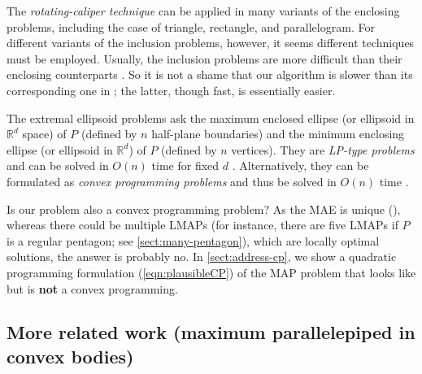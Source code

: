 \documentclass{ws-ijcga}
\begin{document}
The \emph{rotating-caliper technique} \cite{Classic-rcaliper-MEL83} can be applied in many variants of the enclosing problems, including the case of triangle, rectangle, and parallelogram.
    For different variants of the inclusion problems, however, it seems different techniques must be employed.
Usually, the inclusion problems are more difficult than their enclosing counterparts \cite{Othershape-square-Allerton87}.
    So it is not a shame that our algorithm is slower than its corresponding one in \cite{3dorEncl-areaParallelogram-SOCG95}; the latter, though fast, is essentially easier.

\medskip The extremal ellipsoid problems ask the maximum enclosed ellipse (or ellipsoid in $\mathbb{R}^d$ space) of $P$ (defined by $n$ half-plane boundaries) and
          the minimum enclosing ellipse (or ellipsoid in $\mathbb{R}^d$) of $P$ (defined by $n$ vertices).
        They are \emph{LP-type problems} and can be solved in $O(n)$ time for fixed $d$ \cite{ellipse-LPtype-JA96,ellipse-LPtype-SCG92}.
          Alternatively, they can be formulated as \emph{convex programming problems} and thus be solved in $O(n)$ time \cite{ellipse-spanconvex-SCG92,ellipse-ipconvex-tr,ellipse-book-co}.

    Is our problem also a convex programming problem?
  As the MAE is unique (\cite{ellipse-john-CAV48,ellipse-book-co}),
    whereas there could be multiple LMAPs (for instance, there are five LMAPs if $P$ is a regular pentagon; see \ref{sect:many-pentagon}),
      which are locally optimal solutions,
      the answer is probably no.
    In \ref{sect:address-cp}, we show a quadratic programming formulation (\ref{eqn:plausibleCP}) of the MAP problem
      that looks like but is \textbf{not} a convex programming.


\subsection{More related work (maximum parallelepiped in convex bodies)}
\end{document}
